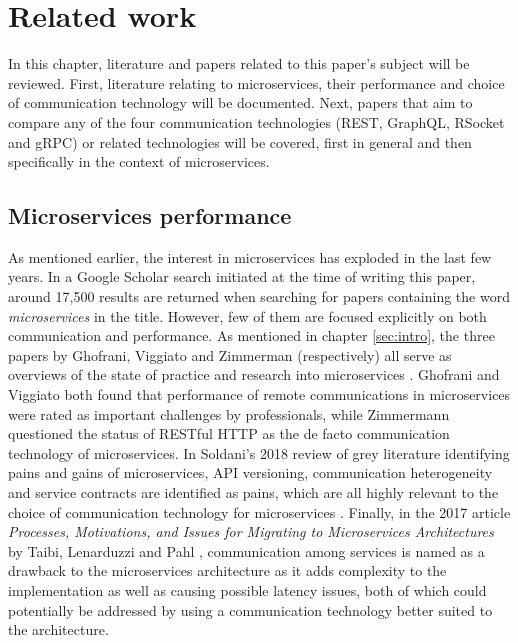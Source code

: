 \chapter{Related work}\label{sec:related}
In this chapter, literature and papers related to this paper's subject will be reviewed. First, literature relating to microservices, their performance and choice of communication technology will be documented. Next, papers that aim to compare any of the four communication technologies (REST, GraphQL, RSocket and gRPC) or related technologies will be covered, first in general and then specifically in the context of microservices.

\section{Microservices performance}
As mentioned earlier, the interest in microservices has exploded in the last few years. In a Google Scholar search initiated at the time of writing this paper, around 17,500 results are returned when searching for papers containing the word \textit{microservices} in the title. However, few of them are focused explicitly on both communication and performance. As mentioned in chapter \ref{sec:intro}, the three papers by Ghofrani, Viggiato and Zimmerman (respectively) all serve as overviews of the state of practice and research into microservices \cite{ghofrani2018challenges} \cite{viggiato2018microservices} \cite{zimmermann2016microservices}. Ghofrani and Viggiato both found that performance of remote communications in microservices were rated as important challenges by professionals, while Zimmermann questioned the status of RESTful HTTP as the de facto communication technology of microservices. In Soldani's 2018 review of grey literature identifying pains and gains of microservices, API versioning, communication heterogeneity and service contracts are identified as pains, which are all highly relevant to the choice of communication technology for microservices \cite{soldani2018pains}. Finally, in the 2017 article \textit{Processes, Motivations, and Issues for Migrating to Microservices Architectures} by Taibi, Lenarduzzi and Pahl \cite{taibi2018architectural}, communication among services is named as a drawback to the microservices architecture as it adds complexity to the implementation as well as causing possible latency issues, both of which could potentially be addressed by using a communication technology better suited to the architecture.

